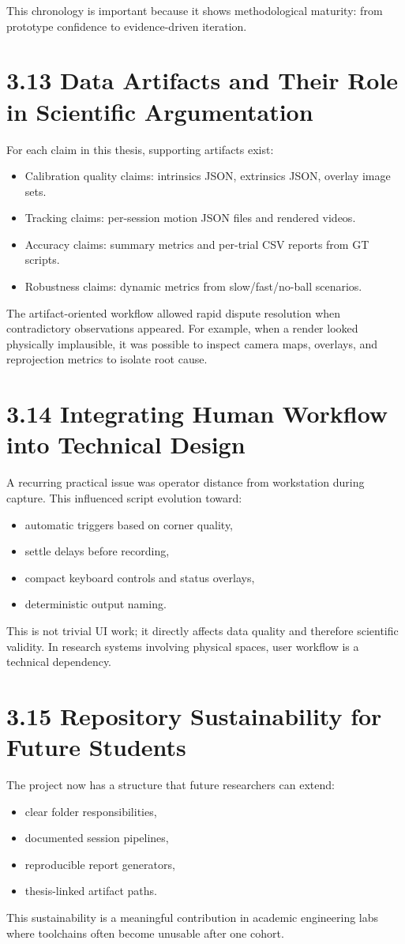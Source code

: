 This chronology is important because it shows methodological maturity: from prototype confidence to evidence-driven iteration.

\section{3.13 Data Artifacts and Their Role in Scientific Argumentation}
For each claim in this thesis, supporting artifacts exist:
\begin{itemize}
  \item Calibration quality claims: intrinsics JSON, extrinsics JSON, overlay image sets.
  \item Tracking claims: per-session motion JSON files and rendered videos.
  \item Accuracy claims: summary metrics and per-trial CSV reports from GT scripts.
  \item Robustness claims: dynamic metrics from slow/fast/no-ball scenarios.
\end{itemize}

The artifact-oriented workflow allowed rapid dispute resolution when contradictory observations appeared. For example, when a render looked physically implausible, it was possible to inspect camera maps, overlays, and reprojection metrics to isolate root cause.

\section{3.14 Integrating Human Workflow into Technical Design}
A recurring practical issue was operator distance from workstation during capture. This influenced script evolution toward:
\begin{itemize}
  \item automatic triggers based on corner quality,
  \item settle delays before recording,
  \item compact keyboard controls and status overlays,
  \item deterministic output naming.
\end{itemize}

This is not trivial UI work; it directly affects data quality and therefore scientific validity. In research systems involving physical spaces, user workflow is a technical dependency.

\section{3.15 Repository Sustainability for Future Students}
The project now has a structure that future researchers can extend:
\begin{itemize}
  \item clear folder responsibilities,
  \item documented session pipelines,
  \item reproducible report generators,
  \item thesis-linked artifact paths.
\end{itemize}

This sustainability is a meaningful contribution in academic engineering labs where toolchains often become unusable after one cohort.
